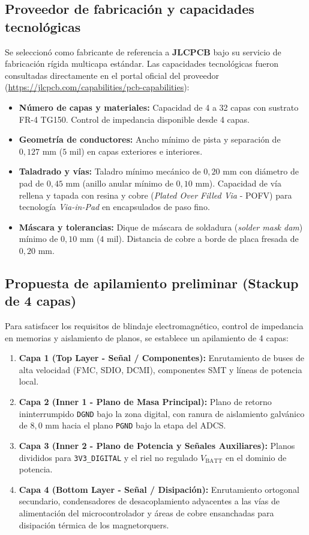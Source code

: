 \documentclass[11pt,a4paper]{article}
\begin{document}
\subsection{Proveedor de fabricación y capacidades tecnológicas}
Se seleccionó como fabricante de referencia a \textbf{JLCPCB} bajo su servicio de fabricación rígida multicapa estándar. Las capacidades tecnológicas fueron consultadas directamente en el portal oficial del proveedor (\url{https://jlcpcb.com/capabilities/pcb-capabilities}):
\begin{itemize}
    \item \textbf{Número de capas y materiales:} Capacidad de 4 a 32 capas con sustrato FR-4 TG150. Control de impedancia disponible desde 4 capas.
    \item \textbf{Geometría de conductores:} Ancho mínimo de pista y separación de $0{,}127\text{ mm}$ ($5\text{ mil}$) en capas exteriores e interiores.
    \item \textbf{Taladrado y vías:} Taladro mínimo mecánico de $0{,}20\text{ mm}$ con diámetro de pad de $0{,}45\text{ mm}$ (anillo anular mínimo de $0{,}10\text{ mm}$). Capacidad de vía rellena y tapada con resina y cobre (\emph{Plated Over Filled Via} - POFV) para tecnología \emph{Via-in-Pad} en encapsulados de paso fino.
    \item \textbf{Máscara y tolerancias:} Dique de máscara de soldadura (\emph{solder mask dam}) mínimo de $0{,}10\text{ mm}$ ($4\text{ mil}$). Distancia de cobre a borde de placa fresada de $0{,}20\text{ mm}$.
\end{itemize}

\subsection{Propuesta de apilamiento preliminar (Stackup de 4 capas)}
Para satisfacer los requisitos de blindaje electromagnético, control de impedancia en memorias y aislamiento de planos, se establece un apilamiento de 4 capas:
\begin{enumerate}
    \item \textbf{Capa 1 (Top Layer - Señal / Componentes):} Enrutamiento de buses de alta velocidad (FMC, SDIO, DCMI), componentes SMT y líneas de potencia local.
    \item \textbf{Capa 2 (Inner 1 - Plano de Masa Principal):} Plano de retorno ininterrumpido \texttt{DGND} bajo la zona digital, con ranura de aislamiento galvánico de $8{,}0\text{ mm}$ hacia el plano \texttt{PGND} bajo la etapa del ADCS.
    \item \textbf{Capa 3 (Inner 2 - Plano de Potencia y Señales Auxiliares):} Planos divididos para \texttt{3V3\_DIGITAL} y el riel no regulado $V_{\text{BATT}}$ en el dominio de potencia.
    \item \textbf{Capa 4 (Bottom Layer - Señal / Disipación):} Enrutamiento ortogonal secundario, condensadores de desacoplamiento adyacentes a las vías de alimentación del microcontrolador y áreas de cobre ensanchadas para disipación térmica de los magnetorquers.
\end{enumerate}
\end{document}
